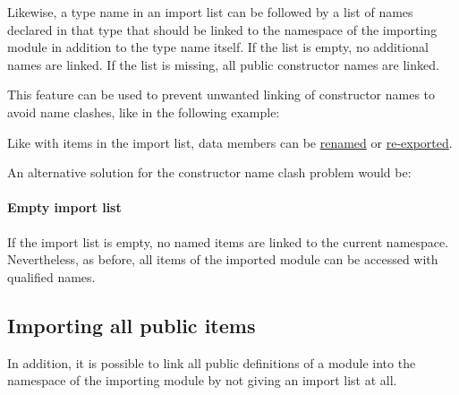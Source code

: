 Likewise, a type name in an import list can be followed by a list of names declared in that type that should be linked to the namespace of the importing module in addition to the type name itself. If the list is empty, no additional names are linked. If the list is missing, all public constructor names are linked.

This feature can be used to prevent unwanted linking of constructor names to avoid name clashes, like in the following example:


Like with items in the import list, data members can be  \hyperref[renameitem]{renamed} 
or  \hyperref[reexport]{re-exported}.
  
An alternative solution for the constructor name clash problem would be:


\paragraph*{Empty import list} If the import list is empty, no named items are linked to the current namespace. Nevertheless, as before, all items of the imported module can be accessed with qualified names.

\subsection{Importing all public items}

In addition, it is possible to link all public definitions of a
module into the namespace of the importing module by not giving an import list at all.

